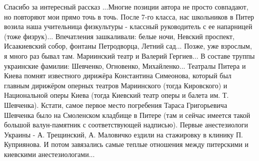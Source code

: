 \begin{itemize}
Спасибо за интересный рассказ ...Многие позиции автора не просто совпадают, но
повторяют мои прямо точь в точь. После 7-го класса, нас школьников в Питер
возила наша учительница физкультуры - классный руководитель с ее напарницей
(тоже физрук)... Впечатления зашкаливали: белые ночи, Невский проспект,
Исаакиевский собор, фонтаны Петродворца, Летний сад... Позже, уже взрослым, я
много раз бывал там. Мариинский театр и Валерий Гергиев... В составе труппы
украинские фамилии: Шевченко, Огновенко, Михайленко... Театралы Питера и Киева
помнят известного дирижёра Константина Симеонова, который был главным дирижёром
оперных театров Мариинского (тогда Кировского) и Национальной оперы Киева
(тогда Киевский театр оперы и балета им. Т. Шевченка). Кстати, самое первое
место погребения Тараса Григорьевича Шевченка было на Смоленском кладбище в
Питере (там и сейчас имеется такой большой валун-памятник с соответствующей
надписью). Первые анестезиологи Украины - А. Трещинский, А. Маловичко ездили на
стажировку в клинику П. Куприянова. И потом завязались самые теплые отношения
между питерскими и киевскими анестезиологами...

\end{itemize} %
